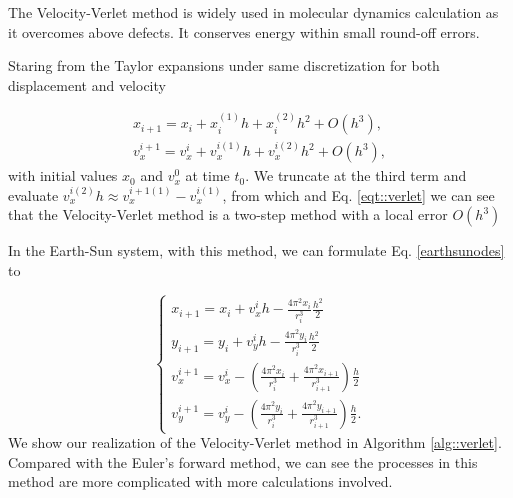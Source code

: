 The Velocity-Verlet method is widely used in molecular dynamics calculation as it overcomes above defects. It conserves energy within small round-off errors\cite{toxvaerd2012energy}.

Staring from the Taylor expansions under same discretization for both displacement and velocity

\begin{equation}
	\label{eqt::verlet}
	\begin{aligned}
		x_{i+1} = x_i + x_i^{(1)}h + x_i^{(2)}h^2 + O(h^3),\\
		v_x^{i+1} = v_x^{i} + v_x^{i(1)}h + v_x^{i(2)}h^2 + O(h^3),
	\end{aligned}
\end{equation}
with initial values $x_0$ and $v_x^0$ at time $t_0$. 
We truncate at the third term and evaluate $v_x^{i(2)}h \approx v_x^{i+1(1)}-v_x^{i(1)}$, 
from which and Eq. \ref{eqt::verlet} we can see that the Velocity-Verlet method is a two-step method with a local error $O(h^3)$

In the Earth-Sun system, with this method, we can formulate Eq. \ref{earthsunodes} to

\begin{equation}
	\left\{  
             \begin{array}{lr}  
             	x_{i+1} = x_i + v_x^{i}h - \frac{4\pi^2x_i}{r_i^3}\frac{h^2}{2} \\
				y_{i+1} = y_i + v_y^{i}h - \frac{4\pi^2y_i}{r_i^3}\frac{h^2}{2} \\
             	v_x^{i+1} = v_x^{i} - (\frac{4\pi^2x_i}{r_i^3}+\frac{4\pi^2x_{i+1}}{r_{i+1}^3})\frac{h}{2}\\
             	v_y^{i+1} = v_y^{i} - (\frac{4\pi^2y_i}{r_i^3}+\frac{4\pi^2y_{i+1}}{r_{i+1}^3})\frac{h}{2}.
			\end{array}  
	\right.	
\end{equation} 
We show our realization of the Velocity-Verlet method in Algorithm \ref{alg::verlet}. 
Compared with the Euler's forward method, we can see the processes in this method are more complicated with more calculations involved.

